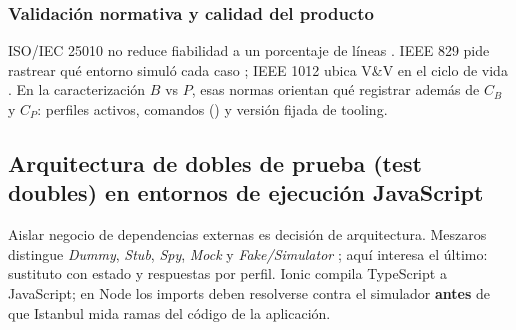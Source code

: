 \subsubsection{Validación normativa y calidad del producto}
ISO/IEC 25010 no reduce fiabilidad a un porcentaje de líneas \cite{iso250102011}. IEEE 829 pide rastrear qué entorno simuló cada caso \cite{ieee8292008}; IEEE 1012 ubica V\&V en el ciclo de vida \cite{ieee10122012}. En la caracterización $B$ vs $P$, esas normas orientan qué registrar además de $C_B$ y $C_P$: perfiles activos, comandos () y versión fijada de tooling.

\subsection{Arquitectura de dobles de prueba (test doubles) en entornos de ejecución JavaScript}
\label{sec:arquitectura_test_doubles}
Aislar negocio de dependencias externas es decisión de arquitectura. Meszaros distingue \textit{Dummy}, \textit{Stub}, \textit{Spy}, \textit{Mock} y \textit{Fake/Simulator} \cite{meszaros2007xunit}; aquí interesa el último: sustituto con estado y respuestas por perfil. Ionic compila TypeScript a JavaScript; en Node los imports  deben resolverse contra el simulador \textbf{antes} de que Istanbul mida ramas del código de la aplicación.

